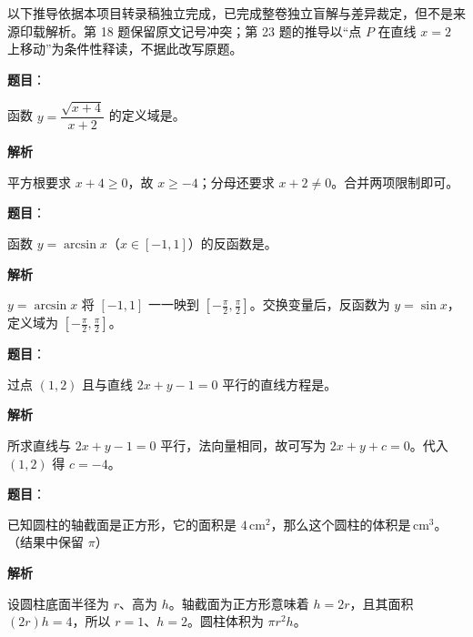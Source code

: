 

\begin{gktip}
以下推导依据本项目转录稿独立完成，已完成整卷独立盲解与差异裁定，但不是来源印载解析。第 18 题保留原文记号冲突；第 23 题的推导以“点 $P$ 在直线 $x=2$ 上移动”为条件性释读，不据此改写原题。
\end{gktip}

\begin{answer}

\textbf{题目}：

函数 $y=\dfrac{\sqrt{x+4}}{x+2}$ 的定义域是\gkblank{}。

\textbf{解析}

平方根要求 $x+4\ge0$，故 $x\ge-4$；分母还要求 $x+2\ne0$。合并两项限制即可。

\gkanswer{答案：$[-4,+\infty)\setminus\{-2\}$}

\end{answer}
\begin{answer}

\textbf{题目}：

函数 $y=\arcsin x$（$x\in[-1,1]$）的反函数是\gkblank{}。

\textbf{解析}

$y=\arcsin x$ 将 $[-1,1]$ 一一映到 $[-\frac\pi2,\frac\pi2]$。交换变量后，反函数为 $y=\sin x$，定义域为 $[-\frac\pi2,\frac\pi2]$。


\end{answer}
\begin{answer}

\textbf{题目}：

过点 $(1,2)$ 且与直线 $2x+y-1=0$ 平行的直线方程是\gkblank{}。

\textbf{解析}

所求直线与 $2x+y-1=0$ 平行，法向量相同，故可写为 $2x+y+c=0$。代入 $(1,2)$ 得 $c=-4$。


\end{answer}
\begin{answer}

\textbf{题目}：

已知圆柱的轴截面是正方形，它的面积是 $4\,\mathrm{cm}^2$，那么这个圆柱的体积是\gkblank{}$\,\mathrm{cm}^3$。（结果中保留 $\pi$）

\textbf{解析}

设圆柱底面半径为 $r$、高为 $h$。轴截面为正方形意味着 $h=2r$，且其面积 $(2r)h=4$，所以 $r=1$、$h=2$。圆柱体积为 $\pi r^2h$。


\end{answer}
